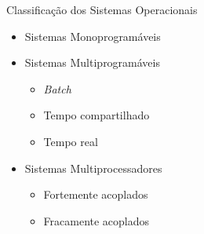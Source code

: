 \documentclass[aspectratio=169,
				xcolor=table]{beamer}
\begin{document}
	\begin{frame}{Classificação dos Sistemas Operacionais}
		\begin{itemize}
			\item Sistemas Monoprogramáveis
			\vspace{1em}
			\item Sistemas Multiprogramáveis
			\begin{itemize}
				\item \textit{Batch}
				\item Tempo compartilhado
				\item Tempo real
			\end{itemize}
			\vspace{1em}
			\item Sistemas Multiprocessadores
			\begin{itemize}
				\item Fortemente acoplados
				\item Fracamente acoplados
			\end{itemize}
		\end{itemize}
	\end{frame}
	
\end{document}
